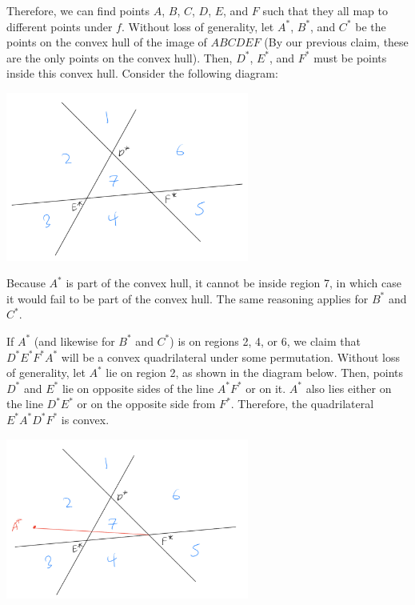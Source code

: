 \documentclass[10pt]{../usamts}
\begin{document}
\begin{solution}
Therefore, we can find points $A$, $B$, $C$, $D$, $E$, and $F$ such that they all map to different points under $f$. Without loss of generality, let $A^*$, $B^*$, and $C^*$ be the points on the convex hull of the image of $ABCDEF$ (By our previous claim, these are the only points on the convex hull). Then, $D^*$, $E^*$, and $F^*$ must be points inside this convex hull. Consider the following diagram:

\begin{center}
    \includegraphics[width=8cm]{round3/p4diagram.jpeg}
\end{center}

Because $A^*$ is part of the convex hull, it cannot be inside region 7, in which case it would fail to be part of the convex hull. The same reasoning applies for $B^*$ and $C^*$.

If $A^*$ (and likewise for $B^*$ and $C^*$) is on regions 2, 4, or 6, we claim that $D^*E^*F^*A^*$ will be a convex quadrilateral under some permutation. Without loss of generality, let $A^*$ lie on region 2, as shown in the diagram below. Then, points $D^*$ and $E^*$ lie on opposite sides of the line $A^*F^*$ or on it. $A^*$ also lies either on the line $D^*E^*$ or on the opposite side from $F^*$. Therefore, the quadrilateral $E^*A^*D^*F^*$ is convex.
\begin{center}
    \includegraphics[width=8cm]{round3/p4diagram_3.jpeg}
\end{center}


\end{solution}
\end{document}

